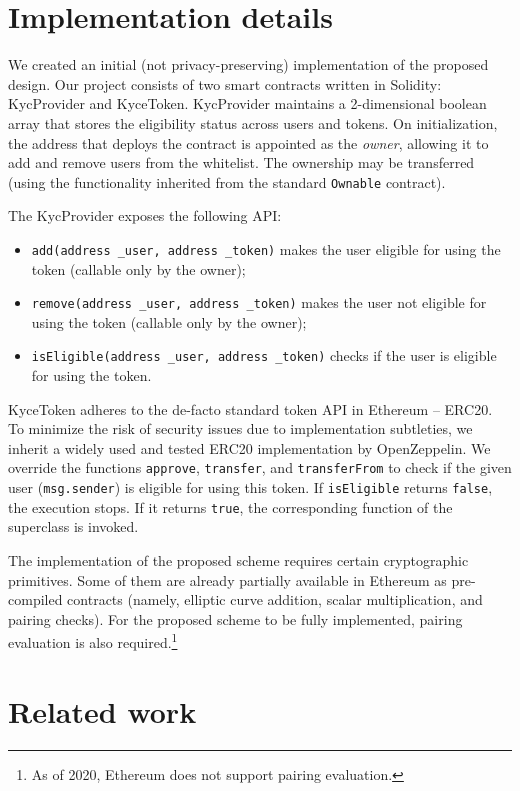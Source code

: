 \section{Implementation details}

We created an initial (not privacy-preserving) implementation of the proposed design.
Our project consists of two smart contracts written in Solidity: KycProvider and KyceToken.
KycProvider maintains a 2-dimensional boolean array that stores the eligibility status across users and tokens.
On initialization, the address that deploys the contract is appointed as the \textit{owner}, allowing it to add and remove users from the whitelist.
The ownership may be transferred (using the functionality inherited from the standard \texttt{Ownable} contract).

The KycProvider exposes the following API:

\begin{itemize}
	\item \texttt{add(address \_user, address \_token)} makes the user eligible for using the token (callable only by the owner);
	\item \texttt{remove(address \_user, address \_token)} makes the user not eligible for using the token (callable only by the owner);
	\item \texttt{isEligible(address \_user, address \_token)} checks if the user is eligible for using the token.
\end{itemize}

KyceToken adheres to the de-facto standard token API in Ethereum -- ERC20.
To minimize the risk of security issues due to implementation subtleties, we inherit a widely used and tested ERC20 implementation by OpenZeppelin.
We override the functions \texttt{approve}, \texttt{transfer}, and \texttt{transferFrom} to check if the given user (\texttt{msg.sender}) is eligible for using this token.
If \texttt{isEligible} returns \texttt{false}, the execution stops.
If it returns \texttt{true}, the corresponding function of the superclass is invoked.

The implementation of the proposed scheme requires certain cryptographic primitives.
Some of them are already partially available in Ethereum as pre-compiled contracts (namely, elliptic curve addition, scalar multiplication, and pairing checks).
For the proposed scheme to be fully implemented, pairing evaluation is also required.\footnote{As of 2020, Ethereum does not support pairing evaluation.}


\section{Related work}

